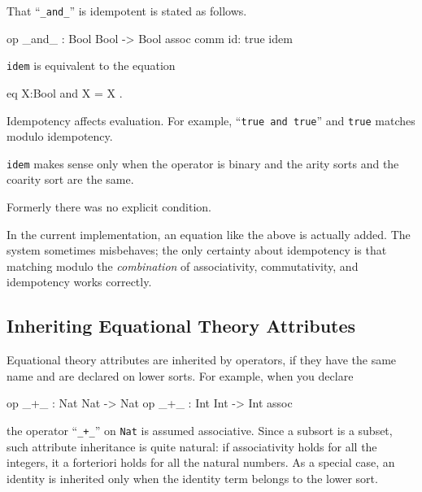 \documentclass[a4paper]{memoir}
\begin{document}
That ``\verb|_and_|'' is idempotent is stated as follows.
\begin{vvtm}
\begin{ccode}
  op _and_ : Bool Bool -> Bool { assoc comm id: true idem }
\end{ccode}
\end{vvtm}
\verb|idem| is equivalent to the equation
\begin{vvtm}
\begin{ccode}
  eq X:Bool and X = X .
\end{ccode}
\end{vvtm}
Idempotency affects evaluation. For example,
``\verb|true and true|'' and \verb|true| matches modulo idempotency.

\verb|idem| makes sense only when the operator is binary and the
arity sorts and the coarity sort are the same.

\begin{warning}
  Formerly there was no explicit condition.
\end{warning}

\begin{warning}
In the current implementation, an equation like the above is
actually added. The system sometimes misbehaves; the only certainty
about idempotency is that matching modulo the {\em combination} of
associativity, commutativity, and idempotency works correctly.
\end{warning}

\subsection{Inheriting Equational Theory Attributes}

Equational theory attributes are
inherited by operators, if they have the same name and are
declared on lower sorts. For example, when you declare
\begin{vvtm}
\begin{ccode}
  op _+_ : Nat Nat -> Nat 
  op _+_ : Int Int -> Int { assoc }
\end{ccode}
\end{vvtm}
the operator ``\verb|_+_|'' on \verb|Nat| is assumed associative.
Since a subsort is a subset, such attribute inheritance is quite natural:
if associativity holds for all the integers, it a forteriori holds for
all the natural numbers.
As a special case, an identity is inherited only when the identity
term belongs to the lower sort.
\end{document}
